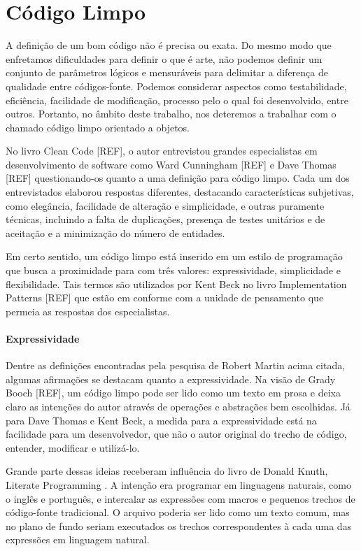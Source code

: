 \chapter{Código Limpo}
\label{chap:codigo_limpo}

A definição de um bom código não é precisa ou exata. Do mesmo modo que enfretamos dificuldades para definir o que é arte, não podemos definir um conjunto de parâmetros lógicos e mensuráveis para delimitar a diferença de qualidade entre códigos-fonte. Podemos considerar aspectos como testabilidade, eficiência, facilidade de modificação, processo pelo o qual foi desenvolvido, entre outros. Portanto, no âmbito deste trabalho, nos deteremos a trabalhar com o chamado código limpo orientado a objetos.

No livro Clean Code [REF], o autor entrevistou grandes especialistas em desenvolvimento de software como Ward Cunningham [REF] e Dave Thomas [REF] questionando-os quanto a uma definição para código limpo. Cada um dos entrevistados elaborou respostas diferentes, destacando características subjetivas, como elegância, facilidade de alteração e simplicidade, e outras puramente técnicas, incluindo a falta de duplicações, presença de testes unitários e de aceitação e a minimização do número de entidades.

Em certo sentido, um código limpo está inserido em um estilo de programação que busca a proximidade para com três valores: expressividade, simplicidade e flexibilidade. Tais termos são utilizados por Kent Beck no livro Implementation Patterns [REF] que estão em conforme com a unidade de pensamento que permeia as respostas dos especialistas.

\subsubsection{Expressividade}
Dentre as definições encontradas pela pesquisa de Robert Martin acima citada, algumas afirmações se destacam quanto a expressividade. Na visão de Grady Booch [REF], um código limpo pode ser lido como um texto em prosa e deixa claro as intenções do autor através de operações e abstrações bem escolhidas. Já para Dave Thomas e Kent Beck, a medida para a expressividade está na facilidade para um desenvolvedor, que não o autor original do trecho de código, entender, modificar e utilizá-lo.

Grande parte dessas ideias receberam influência do livro de Donald Knuth, Literate Programming \cite{Knuth92}. A intenção era programar em linguagens naturais, como o inglês e português, e intercalar as expressões com macros e pequenos trechos de código-fonte tradicional. O arquivo poderia ser lido como um texto comum, mas no plano de fundo seriam executados os trechos correspondentes à cada uma das expressões em linguagem natural.

